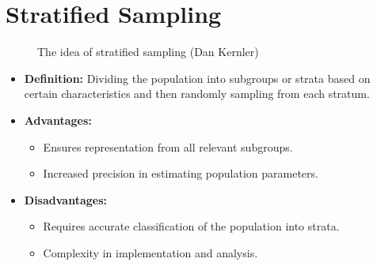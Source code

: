 \documentclass[
  a4paper,
]{scrbook}
\providecommand{\tightlist}{%
  \setlength{\itemsep}{0pt}\setlength{\parskip}{0pt}}\usepackage{longtable,booktabs,array}
\begin{document}
\section{Stratified Sampling}\label{stratified-sampling}

\begin{figure}[H]


\caption{\label{fig-strat-smpl}The idea of stratified sampling (Dan
Kernler)}

\end{figure}%

\begin{itemize}
\tightlist
\item
  \textbf{Definition:} Dividing the population into subgroups or strata
  based on certain characteristics and then randomly sampling from each
  stratum.
\item
  \textbf{Advantages:}

  \begin{itemize}
  \tightlist
  \item
    Ensures representation from all relevant subgroups.
  \item
    Increased precision in estimating population parameters.
  \end{itemize}
\item
  \textbf{Disadvantages:}

  \begin{itemize}
  \tightlist
  \item
    Requires accurate classification of the population into strata.
  \item
    Complexity in implementation and analysis.
  \end{itemize}
\end{itemize}
\end{document}

